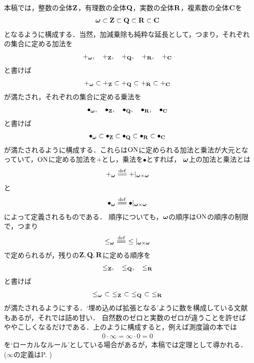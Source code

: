 本稿では，整数の全体$\mathbf{Z}$，有理数の全体$\mathbf{Q}$，実数の全体$\mathbf{R}$，複素数の全体$\mathbf{C}$を
\begin{align}
	{\boldsymbol \omega} \subset \mathbf{Z} \subset \mathbf{Q} \subset \mathbf{R} \subset \mathbf{C}
\end{align}
となるように構成する．当然，加減乗除も純粋な延長として，つまり，それぞれの集合に定める加法を
\begin{align}
	+_{\boldsymbol \omega},\quad +_{\mathbf{Z}},\quad +_{\mathbf{Q}},\quad +_{\mathbf{R}},\quad +_{\mathbf{C}}
\end{align}
と書けば
\begin{align}
	+_{\boldsymbol \omega} \subset +_{\mathbf{Z}} \subset +_{\mathbf{Q}} \subset +_{\mathbf{R}} \subset +_{\mathbf{C}}
\end{align}
が満たされ，それぞれの集合に定める乗法を
\begin{align}
	\bullet_{\boldsymbol \omega},\quad \bullet_{\mathbf{Z}},\quad \bullet_{\mathbf{Q}},\quad \bullet_{\mathbf{R}},\quad \bullet_{\mathbf{C}}
\end{align}
と書けば
\begin{align}
	\bullet_{\boldsymbol \omega} \subset \bullet_{\mathbf{Z}} \subset \bullet_{\mathbf{Q}} \subset \bullet_{\mathbf{R}} \subset \bullet_{\mathbf{C}}
\end{align}
が満たされるように構成する．これらは$\mathrm{ON}$に定められる加法と乗法が大元となっていて，$\mathrm{ON}$に定める加法を$+$とし，乗法を$\bullet$とすれば，
${\boldsymbol \omega}$上の加法と乗法とは
\begin{align}
	+_\Natural \defeq +|_{\Natural \times \Natural}
\end{align}
と
\begin{align}
	\bullet_\Natural \defeq \bullet|_{\Natural \times \Natural}
\end{align}
によって定義されるものである．
順序についても，${\boldsymbol \omega}$の順序は$\mathrm{ON}$の順序の制限で，つまり
\begin{align}
	\leq_\Natural\ \defeq\ \leq|_{\Natural \times \Natural}
\end{align}
で定められるが，残りの$\mathbf{Z},\mathbf{Q},\mathbf{R}$に定める順序を
\begin{align}
	\leq_{\mathbf{Z}},\quad \leq_{\mathbf{Q}},\quad \leq_{\mathbf{R}}
\end{align}
と書けば
\begin{align}
	\leq_{\boldsymbol \omega}\ \subset\ \leq_{\mathbf{Z}}\ \subset\ \leq_{\mathbf{Q}}\ \subset\ \leq_{\mathbf{R}}
\end{align}
が満たされるようにする．`埋め込めば拡張となる'ように数を構成している文献もあるが，それでは詰め甘い．
自然数のゼロと実数のゼロが違うことを許せばややこしくなるだけである．上のように構成すると，例えば測度論の本では
\begin{align}
	0 \cdot \infty = \infty \cdot 0 = 0
\end{align}
を`ローカルなルール'としている場合があるが，本稿では定理として導かれる．
($\infty$の定義はP. \pageref{def:infinity})

